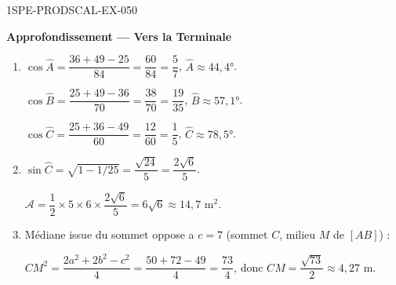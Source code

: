 \begin{corrige}{1SPE-PRODSCAL-EX-050}
\begin{center}\textbf{Approfondissement — Vers la Terminale}\end{center}
\begin{enumerate}
\item $\cos\widehat{A} = \dfrac{36+49-25}{84} = \dfrac{60}{84} = \dfrac{5}{7}$, $\widehat{A} \approx 44{,}4°$.

$\cos\widehat{B} = \dfrac{25+49-36}{70} = \dfrac{38}{70} = \dfrac{19}{35}$, $\widehat{B} \approx 57{,}1°$.

$\cos\widehat{C} = \dfrac{25+36-49}{60} = \dfrac{12}{60} = \dfrac{1}{5}$, $\widehat{C} \approx 78{,}5°$.

\item $\sin\widehat{C} = \sqrt{1 - 1/25} = \dfrac{\sqrt{24}}{5} = \dfrac{2\sqrt{6}}{5}$.

$\mathcal{A} = \dfrac{1}{2} \times 5 \times 6 \times \dfrac{2\sqrt{6}}{5} = 6\sqrt{6} \approx 14{,}7$ m$^2$.

\item Médiane issue du sommet oppose a $c = 7$ (sommet $C$, milieu $M$ de $[AB]$) :

$CM^2 = \dfrac{2a^2 + 2b^2 - c^2}{4} = \dfrac{50 + 72 - 49}{4} = \dfrac{73}{4}$, donc $CM = \dfrac{\sqrt{73}}{2} \approx 4{,}27$ m.
\end{enumerate}
\end{corrige}
